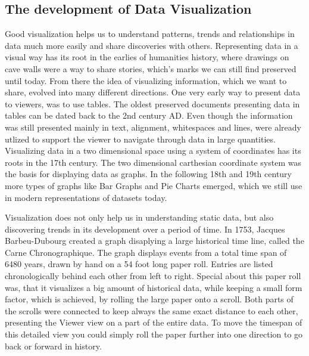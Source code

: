
\subsection{The development of Data Visualization}
\label{sec:fundamentals:charting:history}

Good visualization helps us to understand patterns, trends and relationships in
data much more easily and share discoveries with others. Representing data in a
visual way has its root in the earlies of humanities history, where drawings on
cave walls were a way to share stories, which's marks we can still find
preserved until today. From there the idea of visualizing information, which we
want to share, evolved into many different directions. One very early way to
present data to viewers, was to use tables. The oldest preserved documents
presenting data in tables can be dated back to the 2nd century AD. Even though
the information was still presented mainly in text, alignment, whitespaces and
lines, were already utlized to support the viewer to navigate through data in
large quantities.  Visualizing data in a two dimensional space using a system of
coordinates has its roots in the 17th century. The two dimensional carthesian
coordinate system was the basis for displaying data as graphs. In the following
18th and 19th century more types of graphs like Bar Graphs and Pie Charts
emerged, which we still use in modern representations of datasets today.
\cite{DataVisHistory}

Visualization does not only help us in understanding static data, but also
discovering trends in its development over a period of time. In 1753, Jacques
Barbeu-Dubourg created a graph disaplying a large historical time line, called
the Carne Chronographique. The graph displays events from a total time span of
6480 years, drawn by hand on a 54 foot long paper roll. Entries are listed
chronologically behind each other from left to right. Special about this paper
roll was, that it visualizes a big amount of historical data, while keeping a
small form factor, which is achieved, by rolling the large paper onto a scroll.
Both parts of the scrolls were connected to keep always the same exact distance
to each other, presenting the Viewer view on a part of the entire data. To move
the timespan of this detailed view you could simply roll the paper further into
one direction to go back or forward in history.  \cite{DataVisHistPresentation}

